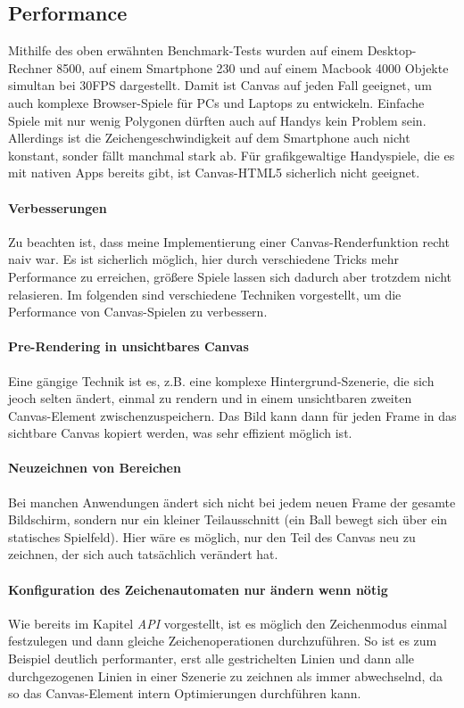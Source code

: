 \documentclass[a4paper, 12pt]{article}
\begin{document}
\subsection{Performance}
Mithilfe des oben erwähnten Benchmark-Tests wurden auf einem Desktop-Rechner 8500, auf einem Smartphone 230 und auf einem Macbook 4000 Objekte simultan bei 30FPS dargestellt. Damit ist Canvas auf jeden Fall geeignet, um auch komplexe Browser-Spiele für PCs und Laptops zu entwickeln. Einfache Spiele mit nur wenig Polygonen dürften auch auf Handys kein Problem sein. Allerdings ist die Zeichengeschwindigkeit auf dem Smartphone auch nicht konstant, sonder fällt manchmal stark ab. Für grafikgewaltige Handyspiele, die es mit nativen Apps bereits gibt, ist Canvas-HTML5 sicherlich nicht geeignet.
\paragraph{Verbesserungen} Zu beachten ist, dass meine Implementierung einer Canvas-Renderfunktion recht naiv war. Es ist sicherlich möglich, hier durch verschiedene Tricks mehr Performance zu erreichen, größere Spiele lassen sich dadurch aber trotzdem nicht relasieren. Im folgenden sind verschiedene Techniken vorgestellt, um die Performance von Canvas-Spielen zu verbessern.
\paragraph{Pre-Rendering in unsichtbares Canvas} Eine gängige Technik ist es, z.B. eine komplexe Hintergrund-Szenerie, die sich jeoch selten ändert, einmal zu rendern und in einem unsichtbaren zweiten Canvas-Element zwischenzuspeichern. Das Bild kann dann für jeden Frame in das sichtbare Canvas kopiert werden, was sehr effizient möglich ist.
\paragraph{Neuzeichnen von Bereichen} Bei manchen Anwendungen ändert sich nicht bei jedem neuen Frame der gesamte Bildschirm, sondern nur ein kleiner Teilausschnitt (ein Ball bewegt sich über ein statisches Spielfeld). Hier wäre es möglich, nur den Teil des Canvas neu zu zeichnen, der sich auch tatsächlich verändert hat.
\paragraph{Konfiguration des Zeichenautomaten nur ändern wenn nötig} Wie bereits im Kapitel \emph{API} vorgestellt, ist es möglich den Zeichenmodus einmal festzulegen und dann gleiche Zeichenoperationen durchzuführen. So ist es zum Beispiel deutlich performanter, erst alle gestrichelten Linien und dann alle durchgezogenen Linien in einer Szenerie zu zeichnen als immer abwechselnd, da so das Canvas-Element intern Optimierungen durchführen kann.
\end{document}
